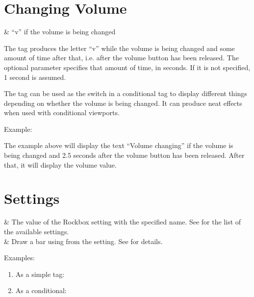 \section{Changing Volume}
  \begin{tagmap}
     & ``v'' if the volume is being changed\\
  \end{tagmap}

The tag produces the letter ``v'' while the volume is being changed and some
amount of time after that, i.e. after the volume button has been released. The
optional parameter  specifies that amount of time, in seconds. If it
is not specified, 1 second is assumed.

The tag can be used as the switch in a conditional tag to display different things
depending on whether the volume is being changed. It can produce neat effects
when used with conditional viewports.

Example: 

The example above will display the text ``Volume changing'' if the volume is
being changed and 2.5 seconds after the volume button has been released. After
that, it will display the volume value.

\section{Settings}
  \begin{tagmap}
     & The value of the Rockbox
             setting with the specified name. See 
             for the list of the available settings.\\
     & Draw a bar using from the setting.
            See  for details.\\
  \end{tagmap}

Examples:
\begin{enumerate}
\item As a simple tag: 
\item As a conditional: 
\end{enumerate}

